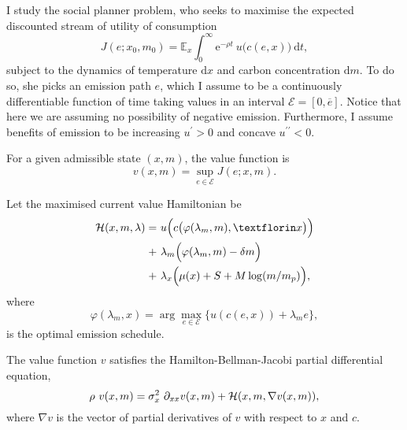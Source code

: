 \documentclass[../../main.tex]{subfiles}
\begin{document}
    I study the social planner problem, who seeks to maximise the expected discounted stream of utility of consumption \begin{equation}
        J(e; x_0, m_0) = \mathbb{E}_{x} \int^{\infty}_0 \mathrm{e}^{-\rho t} \ u\Big(c(e, x)\Big) \ \text{d} t,
    \end{equation} subject to the dynamics of temperature $\text{d}x$ and carbon concentration $\text{d}m$. To do so, she picks an emission path $e$, which I assume to be a continuously differentiable function of time taking values in an interval $\mathcal{E} = [0, \overline{e}]$. Notice that here we are assuming no possibility of negative emission. Furthermore, I assume benefits of emission to be increasing $u^\prime > 0$ and concave $u^{\prime \prime} < 0$. 

    For a given admissible state $(x, m)$, the value function is \begin{equation}
        v(x, m) = \sup_{e \in \mathcal{E}} J(e; x, m).
    \end{equation} 

    \begin{definition}
        Let the maximised current value Hamiltonian be \begin{equation}
            \begin{split}
                \H(x, m, \mathbf{\lambda}) = \ &u\Big(c\big(\varphi(\lambda_m, m), ƒx \big) \Big) \\
                + \ &\lambda_m \Big(\varphi(\lambda_m, m) - \delta m\Big) \\
                + \ &\lambda_x \Big(\mu(x) + S + M \log(m / m_p)\Big),
            \end{split}
        \end{equation} where \begin{equation}
            \varphi(\lambda_m, x) = \arg\max_{e \in \mathcal{E}} \Big\{ u(c(e, x)) + \lambda_m e \Big\},
        \end{equation} is the optimal emission schedule.
    \end{definition}

    \begin{proposition}
        The value function $v$ satisfies the Hamilton-Bellman-Jacobi partial differential equation, \begin{equation} \label{eq:hbj}
            \rho \ v(x, m) = \sigma^2_x \ \partial_{x x} v(x, m) + \mathcal{H}(x, m, \nabla v(x, m)),
        \end{equation} where $\nabla v$ is the vector of partial derivatives of $v$ with respect to $x$ and $c$.
    \end{proposition}
\end{document}
